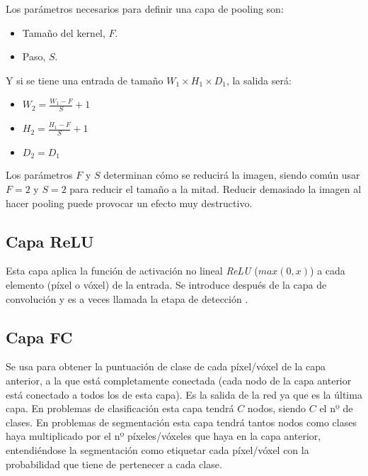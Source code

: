 Los parámetros necesarios para definir una capa de pooling son:
\begin{itemize}
\item Tamaño del kernel, $F$.
\item Paso, $S$.
\end{itemize} 

Y si se tiene una entrada de tamaño $W_1 \times H_1 \times D_1$, la salida será:
\begin{itemize}
\item $W_2 = \frac{W_1 - F}{S} + 1$
\item $H_2 = \frac{H_1 - F}{S} + 1$
\item $D_2 = D_1$
\end{itemize}

Los parámetros $F$ y $S$ determinan cómo se reducirá la imagen, siendo común usar $F=2$ y $S=2$ para reducir el tamaño a la mitad. Reducir demasiado la imagen al hacer pooling puede provocar un efecto muy destructivo.


\subsection{Capa ReLU}

Esta capa aplica la función de activación no lineal \textit{ReLU} ($max(0,x)$) a cada elemento (píxel o vóxel) de la entrada. Se introduce después de la capa de convolución y es a veces llamada la etapa de detección \cite[335]{Goodfellow2016}.

\subsection{Capa FC}

Se usa para obtener la puntuación de clase de cada píxel/vóxel de la capa anterior, a la que está completamente conectada (cada nodo de la capa anterior está conectado a todos los de esta capa). Es la salida de la red ya que es la última capa. En problemas de clasificación esta capa tendrá $C$ nodos, siendo $C$ el nº de clases. En problemas de segmentación esta capa tendrá tantos nodos como clases haya multiplicado por el nº píxeles/vóxeles que haya en la capa anterior, entendiéndose la segmentación como etiquetar cada píxel/vóxel con la probabilidad que tiene de pertenecer a cada clase.

